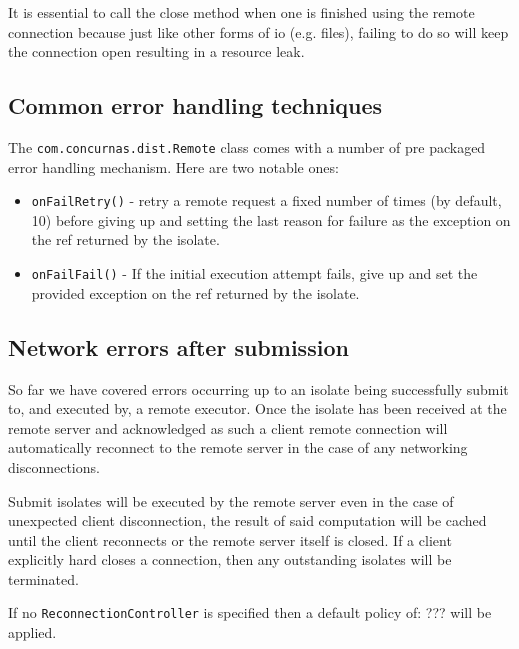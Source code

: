 \documentclass[conc-doc]{subfiles}
\begin{document}
It is essential to call the close method when one is finished using the remote connection because just like other forms of io (e.g. files), failing to do so will keep the connection open resulting in a resource leak.

\subsection{Common error handling techniques}
The \lstinline{com.concurnas.dist.Remote} class comes with a number of pre packaged error handling mechanism. Here are two notable ones:

\begin{itemize}
	\item \lstinline{onFailRetry()} - retry a remote request a fixed number of times (by default, 10) before giving up and setting the last reason for failure as the exception on the ref returned by the isolate.
	\item \lstinline{onFailFail()} - If the initial execution attempt fails, give up and set the provided exception on the ref returned by the isolate.
\end{itemize}

\subsection{Network errors after submission}
So far we have covered errors occurring up to an isolate being successfully submit to, and executed by, a remote executor. Once the isolate has been received at the remote server and acknowledged as such a client remote connection will automatically reconnect to the remote server in the case of any networking disconnections.

Submit isolates will be executed by the remote server even in the case of unexpected client disconnection, the result of said computation will be cached until the client reconnects or the remote server itself is closed. If a client explicitly hard closes a connection, then any outstanding isolates will be terminated.



If no \lstinline{ReconnectionController} is specified then a default policy of: ??? will be applied.
\end{document}
